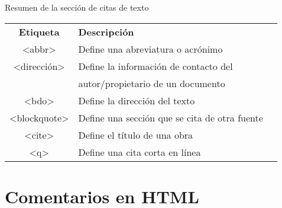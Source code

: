 \begin{frame}[c]{Resumen de la sección de citas de texto}
  \begin{table}[]
  \begin{tabular}{cll}
    \textbf{Etiqueta} &  \textbf{Descripción} \\
    \rowcolor{light-gray}
      <abbr> & Define una abreviatura o acrónimo \\
      <dirección>  & Define la información de contacto del \\
                   & autor/propietario de un documento \\
    \rowcolor{light-gray}
      <bdo> & Define la dirección del texto \\
      <blockquote>  & Define una sección que se cita de otra fuente \\
    \rowcolor{light-gray}
      <cite> & Define el título de una obra \\
      <q> & Define una cita corta en línea \\
  \end{tabular}
  \end{table}

\end{frame}

\section{Comentarios en HTML}




\begin{frame}[c]{}

\end{frame}

\begin{frame}[fragile]
  \frametitle{}

  \vspace{\baselineskip}
  \begin{lstlisting}
  \end{lstlisting}
\end{frame}

